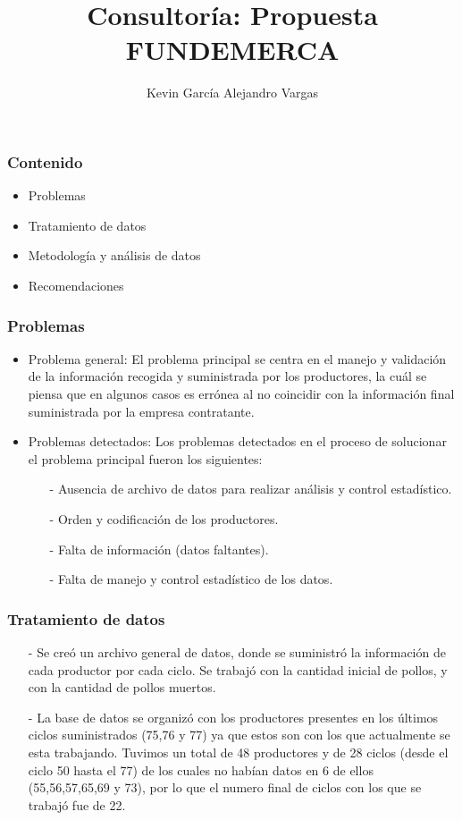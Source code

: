 \documentclass[11pt]{beamer}
\author[Kevin García - Alejandro Vargas]{Kevin García \newline Alejandro Vargas }
\title[Consultoría]{Consultoría: Propuesta FUNDEMERCA}
\begin{document}
\justifying


\begin{frame}
\titlepage
\end{frame}


\begin{frame}
\frametitle{Contenido}
\begin{itemize}
\item Problemas
\item Tratamiento de datos
\item Metodología y análisis de datos
\item Recomendaciones
\end{itemize}
\end{frame}

\begin{frame}
\frametitle{Problemas}
\begin{itemize}
\justifying
\item Problema general: El problema principal se centra en el manejo y validación de la información recogida y suministrada por los productores, la cuál se piensa que en algunos casos es errónea al no coincidir con la información final suministrada por la empresa contratante.
\item Problemas detectados: Los problemas detectados en el proceso de solucionar el problema principal fueron los siguientes:
\begin{itemize}
\item[-]Ausencia de archivo de datos para realizar análisis y control estadístico.
\item[-]Orden y codificación de los productores.
\item[-]Falta de información (datos faltantes).
\item[-]Falta de manejo y control estadístico de los datos.
\end{itemize}
\end{itemize}
\end{frame}

\begin{frame}
\frametitle{Tratamiento de datos}
\begin{itemize}
\justifying
\item[-]Se creó un archivo general de datos, donde se suministró la información de cada productor por cada ciclo. Se trabajó con la cantidad inicial de pollos, y con la cantidad de pollos muertos.
\item[-]La base de datos se organizó con los productores presentes en los últimos ciclos suministrados (75,76 y 77) ya que estos son con los que actualmente se esta trabajando. Tuvimos un total de 48 productores y de 28 ciclos (desde el ciclo 50 hasta el 77) de los cuales no habían datos en 6 de ellos (55,56,57,65,69 y 73), por lo que el numero final de ciclos con los que se trabajó fue de 22.
\end{itemize}
\end{frame}
\end{document}

